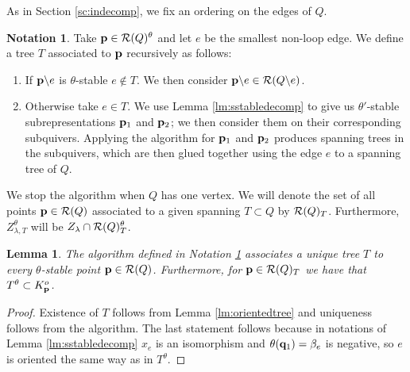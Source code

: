 \documentclass{amsart}
\newtheorem{lem}[thm]{Lemma}
\theoremstyle{definition}
\newtheorem{notn}[thm]{Notation}
\begin{document}
As in Section \ref{sc:indecomp}, we fix an ordering on the edges of $Q$.
\begin{notn}\label{notn:intree}
Take $\mathbf{p} \in \mathcal{R}(Q)^\theta$ and let $e$ be the smallest non-loop edge.
We define a tree $T$ associated to $\mathbf{p}$ recursively as follows:
\begin{enumerate}
\item If $\mathbf{p} \backslash e$ is $\theta$-stable $e\notin T$.
We then consider $\mathbf{p}\backslash e \in \mathcal{R}(Q \backslash e)$.
\item Otherwise take $e \in T$. We use Lemma \ref{lm:sstabledecomp} to give us $\theta'$-stable subrepresentations $\mathbf{p}_1$ and $\mathbf{p}_2$; we then consider them on their corresponding subquivers. Applying the algorithm for $\mathbf{p}_1$ and $\mathbf{p}_2$ produces spanning trees in the subquivers, which are then glued together using the edge $e$ to a spanning tree of $Q$.
\end{enumerate}
We stop the algorithm when $Q$ has one vertex.
We will denote the set of all points $\mathbf{p} \in \mathcal{R}(Q)$ associated to a given spanning $T \subset Q$ by $\mathcal{R}(Q)_T$.
Furthermore, $Z_{\lambda,T}^\theta$ will be $Z_{\lambda} \cap \mathcal{R}(Q)_T^\theta$.
\end{notn}

\begin{lem}
The algorithm defined in Notation \ref{notn:intree} associates a unique tree $T$ to every $\theta$-stable point $\mathbf{p} \in \mathcal{R}(Q)$.
Furthermore, for $\mathbf{p} \in \mathcal{R}(Q)_T$ we have that $T^\theta \subset K_{\mathbf{p}}^o$.
\end{lem}

\begin{proof}
Existence of $T$ follows from Lemma \ref{lm:orientedtree} and uniqueness follows from the algorithm.
The last statement follows because in notations of Lemma \ref{lm:sstabledecomp} $x_e$ is an isomorphism and $\theta(\mathbf{q}_1)=\beta_e$ is negative, so $e$ is oriented the same way as in $T^\theta$.
\end{proof}
\end{document}
